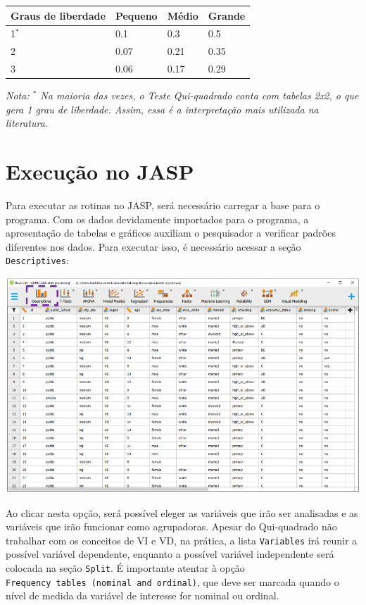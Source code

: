 \documentclass[
]{book}
\begin{document}
\begin{longtable}[]{@{}llll@{}}
\toprule
Graus de liberdade & Pequeno & Médio & Grande \\
\midrule
\endhead
1\(^*\) & 0.1 & 0.3 & 0.5 \\
2 & 0.07 & 0.21 & 0.35 \\
3 & 0.06 & 0.17 & 0.29 \\
\bottomrule
\end{longtable}

\emph{Nota: \(^*\) Na maioria das vezes, o Teste Qui-quadrado conta com tabelas 2x2, o que gera 1 grau de liberdade. Assim, essa é a interpretação mais utilizada na literatura.}

\hypertarget{execuuxe7uxe3o-no-jasp-1}{%
\section{Execução no JASP}\label{execuuxe7uxe3o-no-jasp-1}}

Para executar as rotinas no JASP, será necessário carregar a base para o programa. Com os dados devidamente importados para o programa, a apresentação de tabelas e gráficos auxiliam o pesquisador a verificar padrões diferentes nos dados. Para executar isso, é necessário acessar a seção \texttt{Descriptives}:

\includegraphics{./img/cap_x2_tela_inicial.png}

Ao clicar nesta opção, será possível eleger as variáveis que irão ser analisadas e as variáveis que irão funcionar como agrupadoras. Apesar do Qui-quadrado não trabalhar com os conceitos de VI e VD, na prática, a lista \texttt{Variables} irá reunir a possível variável dependente, enquanto a possível variável independente será colocada na seção \texttt{Split}. É importante atentar à opção \texttt{Frequency\ tables\ (nominal\ and\ ordinal)}, que deve ser marcada quando o nível de medida da variável de interesse for nominal ou ordinal.
\end{document}

